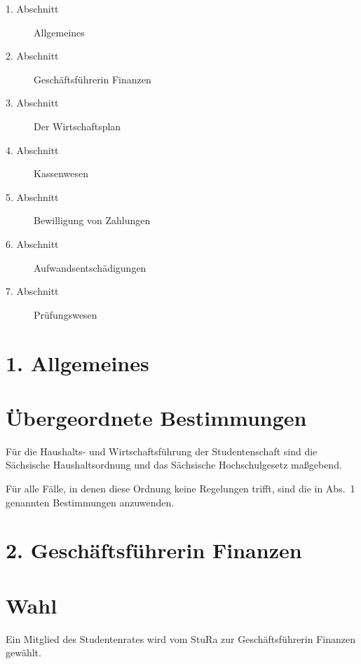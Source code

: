 \setcounter{section}{0}
\begin{multicols}{2}
 
       
        \begin{description}
            \item[1. Abschnitt] Allgemeines
            \item[2. Abschnitt] Geschäftsführerin Finanzen
            \item[3. Abschnitt] Der Wirtschaftsplan
            \item[4. Abschnitt] Kassenwesen
            \item[5. Abschnitt] Bewilligung von Zahlungen
            \item[6. Abschnitt] Aufwandsentschädigungen
            \item[7. Abschnitt] Prüfungswesen
        \end{description}




\section*{1. Allgemeines}

\section{Übergeordnete Bestimmungen}

\Abs \Satz Für die Haushalts- und Wirtschaftsführung der Studentenschaft sind die Sächsische Haushaltsordnung und das Sächsische Hochschulgesetz maßgebend.

\Abs \Satz Für alle Fälle, in denen diese Ordnung keine Regelungen trifft, sind die in Abs.~1 genannten Bestimmungen anzuwenden.


\section*{2. Geschäftsführerin Finanzen}



\section{Wahl}

\Abs \Satz Ein Mitglied des Studentenrates wird vom StuRa zur Geschäftsführerin Finanzen gewählt.


\end{multicols}
